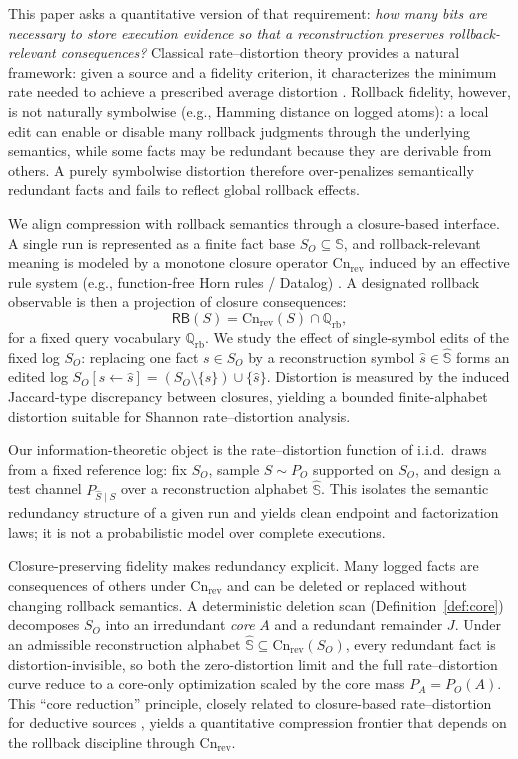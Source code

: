 \documentclass[twoside]{article}
\newcommand{\Cn}{\mathrm{Cn}}
\newcommand{\1}{\mathbf{1}}
\begin{document}
This paper asks a quantitative version of that requirement:
\emph{how many bits are necessary to store execution evidence so that a
reconstruction preserves rollback-relevant consequences?}
Classical rate--distortion theory provides a natural framework: given a source
and a fidelity criterion, it characterizes the minimum rate needed to achieve a
prescribed average distortion \cite{shannon1959coding,cover2006elements,
csizsar2011information}.
Rollback fidelity, however, is not naturally symbolwise (e.g., Hamming distance on
logged atoms): a local edit can enable or disable many rollback judgments through
the underlying semantics, while some facts may be redundant because they are
derivable from others.
A purely symbolwise distortion therefore over-penalizes semantically redundant
facts and fails to reflect global rollback effects.

We align compression with rollback semantics through a closure-based interface.
A single run is represented as a finite fact base \(S_O\subseteq\mathbb{S}\),
and rollback-relevant meaning is modeled by a monotone closure operator
\(\Cn_{\mathrm{rev}}\) induced by an effective rule system (e.g., function-free
Horn rules / Datalog) \cite{abiteboul1995foundations,krotzsch2025modern}.
A designated rollback observable is then a projection of closure consequences:
\[
\mathsf{RB}(S)=\Cn_{\mathrm{rev}}(S)\cap\mathbb{Q}_{\mathrm{rb}},
\]
for a fixed query vocabulary \(\mathbb{Q}_{\mathrm{rb}}\).
We study the effect of single-symbol edits of the fixed log \(S_O\): replacing
one fact \(s\in S_O\) by a reconstruction symbol \(\hat{s}\in\hat{\mathbb{S}}\)
forms an edited log
\(S_O[s\leftarrow \hat{s}]=(S_O\setminus\{s\})\cup\{\hat{s}\}\).
Distortion is measured by the induced Jaccard-type discrepancy between closures,
yielding a bounded finite-alphabet distortion suitable for Shannon rate--distortion
analysis.

Our information-theoretic object is the rate--distortion function of i.i.d.\ draws
from a fixed reference log: fix \(S_O\), sample \(S\sim P_O\) supported on \(S_O\),
and design a test channel \(P_{\hat{S}\mid S}\) over a reconstruction alphabet
\(\hat{\mathbb{S}}\).
This isolates the semantic redundancy structure of a given run and yields clean
endpoint and factorization laws; it is not a probabilistic model over complete
executions.

Closure-preserving fidelity makes redundancy explicit.
Many logged facts are consequences of others under \(\Cn_{\mathrm{rev}}\) and can
be deleted or replaced without changing rollback semantics.
A deterministic deletion scan (Definition~\ref{def:core}) decomposes \(S_O\) into
an irredundant \emph{core} \(A\) and a redundant remainder \(J\).
Under an admissible reconstruction alphabet
\(\hat{\mathbb{S}}\subseteq\Cn_{\mathrm{rev}}(S_O)\), every redundant fact is
distortion-invisible, so both the zero-distortion limit and the full
rate--distortion curve reduce to a core-only optimization scaled by the core mass
\(P_A=P_O(A)\).
This ``core reduction'' principle, closely related to closure-based
rate--distortion for deductive sources \cite{xu2026rate}, yields a quantitative
compression frontier that depends on the rollback discipline through
\(\Cn_{\mathrm{rev}}\).
\end{document}
